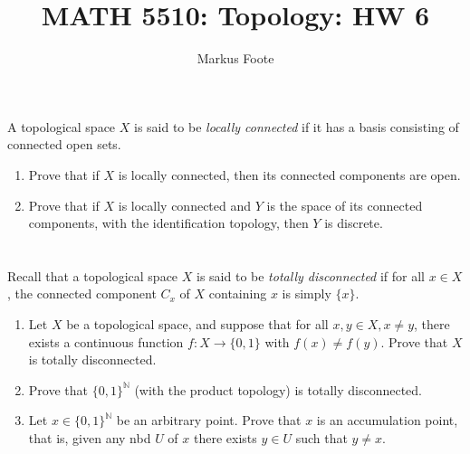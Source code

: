 \documentclass{jhwhw}
\title{MATH 5510: Topology: HW 6}
\author{Markus Foote}
\newcommand{\N}{{\mathbb N}}
\begin{document}
\problem{}%
A topological space $X$ is said to be \emph{locally connected} if it has a basis consisting of connected open sets.
\begin{enumerate}
	\item Prove that if $X$ is locally connected, then its connected components are open.
	\item Prove that if $X$ is locally connected and $Y$ is the space of its connected components, with the identification topology, then $Y$ is discrete.
\end{enumerate}
\solution{}
\part{}
\part{}


\problem{} %
Recall that a topological space $X$ is said to be \emph{totally disconnected} if for all $x\in X$, the connected component $C_x$ of $X$ containing $x$ is simply $\{x\}$.  %
\begin{enumerate}
	
	\item Let $X$ be a topological space, and suppose that for all $x,y \in X, x\ne y$, there exists a continuous  function $f:X\to \{0,1\}$ with $f(x)\ne f(y)$. Prove that $X$ is totally disconnected.
	
	
	\item Prove that $\{0,1\}^\N$ (with the product topology) is totally disconnected.
	
	\item Let $ x \in \{0,1\}^\N$ be an arbitrary point.  Prove that $x$ is an accumulation point, that is, given any nbd $U $ of $x$ there exists $y\in U$ such that $y\ne x$.  
\end{enumerate}
\solution{}
\part{}%
\part{}%
\part{}%
\end{document}
